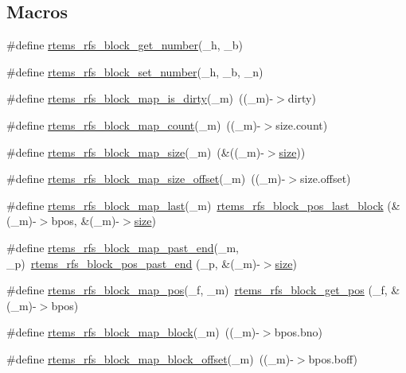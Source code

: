\subsection*{Macros}
\begin{DoxyCompactItemize}
\item 
\#define \mbox{\hyperlink{rtems-rfs-block_8h_a1fae6583887a6e10a9fc10466aec4871}{rtems\+\_\+rfs\+\_\+block\+\_\+get\+\_\+number}}(\+\_\+h,  \+\_\+b)
\item 
\#define \mbox{\hyperlink{rtems-rfs-block_8h_a3106dad1324083f22f43e9f76a9e3c64}{rtems\+\_\+rfs\+\_\+block\+\_\+set\+\_\+number}}(\+\_\+h,  \+\_\+b,  \+\_\+n)
\item 
\#define \mbox{\hyperlink{rtems-rfs-block_8h_a549d6991e0ac178c6dd0df88778103ad}{rtems\+\_\+rfs\+\_\+block\+\_\+map\+\_\+is\+\_\+dirty}}(\+\_\+m)~((\+\_\+m)-\/$>$dirty)
\item 
\#define \mbox{\hyperlink{rtems-rfs-block_8h_a62eff0ebf3f1245d1b377c01bfc61e3a}{rtems\+\_\+rfs\+\_\+block\+\_\+map\+\_\+count}}(\+\_\+m)~((\+\_\+m)-\/$>$size.\+count)
\item 
\#define \mbox{\hyperlink{rtems-rfs-block_8h_ae3b8d48771938228784bb2a5edaff697}{rtems\+\_\+rfs\+\_\+block\+\_\+map\+\_\+size}}(\+\_\+m)~(\&((\+\_\+m)-\/$>$\mbox{\hyperlink{sun4u_2tte_8h_a245260f6f74972558f61b85227df5aae}{size}}))
\item 
\#define \mbox{\hyperlink{rtems-rfs-block_8h_a38a9929ea04e6dd7f761b7bb5013fcb8}{rtems\+\_\+rfs\+\_\+block\+\_\+map\+\_\+size\+\_\+offset}}(\+\_\+m)~((\+\_\+m)-\/$>$size.\+offset)
\item 
\#define \mbox{\hyperlink{rtems-rfs-block_8h_aa8c216119709425d653004badbdd112f}{rtems\+\_\+rfs\+\_\+block\+\_\+map\+\_\+last}}(\+\_\+m)~\mbox{\hyperlink{rtems-rfs-block-pos_8h_af9de1169214c5fbc1d5cbb8265e4b759}{rtems\+\_\+rfs\+\_\+block\+\_\+pos\+\_\+last\+\_\+block}} (\&(\+\_\+m)-\/$>$bpos, \&(\+\_\+m)-\/$>$\mbox{\hyperlink{sun4u_2tte_8h_a245260f6f74972558f61b85227df5aae}{size}})
\item 
\#define \mbox{\hyperlink{rtems-rfs-block_8h_ae63fea18cd527d6b6c5049d7f36196c4}{rtems\+\_\+rfs\+\_\+block\+\_\+map\+\_\+past\+\_\+end}}(\+\_\+m,  \+\_\+p)~\mbox{\hyperlink{rtems-rfs-block-pos_8h_a7c9df0abcb57dfe35e4e18ae63356077}{rtems\+\_\+rfs\+\_\+block\+\_\+pos\+\_\+past\+\_\+end}} (\+\_\+p, \&(\+\_\+m)-\/$>$\mbox{\hyperlink{sun4u_2tte_8h_a245260f6f74972558f61b85227df5aae}{size}})
\item 
\#define \mbox{\hyperlink{rtems-rfs-block_8h_a08acb6d8355c8533a760c9dffa3598fa}{rtems\+\_\+rfs\+\_\+block\+\_\+map\+\_\+pos}}(\+\_\+f,  \+\_\+m)~\mbox{\hyperlink{rtems-rfs-block_8c_a76f70461e9f76aa1f6739a13a8f26735}{rtems\+\_\+rfs\+\_\+block\+\_\+get\+\_\+pos}} (\+\_\+f, \&(\+\_\+m)-\/$>$bpos)
\item 
\#define \mbox{\hyperlink{rtems-rfs-block_8h_a3b2ba358af43eacc75bab0a43df635b4}{rtems\+\_\+rfs\+\_\+block\+\_\+map\+\_\+block}}(\+\_\+m)~((\+\_\+m)-\/$>$bpos.\+bno)
\item 
\#define \mbox{\hyperlink{rtems-rfs-block_8h_a2e08847a8a8a412af576b52464934461}{rtems\+\_\+rfs\+\_\+block\+\_\+map\+\_\+block\+\_\+offset}}(\+\_\+m)~((\+\_\+m)-\/$>$bpos.\+boff)
\end{DoxyCompactItemize}
